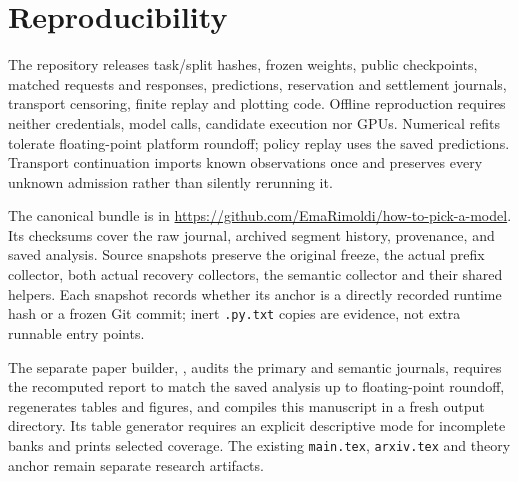 \documentclass[10pt,twocolumn]{article}
\begin{document}
\section{Reproducibility}

The repository releases task/split hashes, frozen weights, public checkpoints,
matched requests and responses, predictions, reservation and settlement journals,
transport censoring, finite replay and plotting code. Offline reproduction
requires neither credentials, model calls, candidate execution nor GPUs.
Numerical refits tolerate floating-point platform roundoff; policy replay uses
the saved predictions. Transport continuation imports known observations once
and preserves every unknown admission rather than silently rerunning it.

The canonical bundle is
in \url{https://github.com/EmaRimoldi/how-to-pick-a-model}. Its checksums cover
the raw journal, archived segment history, provenance, and saved analysis.
Source snapshots preserve the original freeze, the actual prefix collector,
both actual recovery collectors, the semantic collector and their shared
helpers. Each snapshot records whether its anchor is a directly recorded
runtime hash or a frozen Git commit; inert \texttt{.py.txt} copies are evidence,
not extra runnable entry points.

The separate paper builder, , audits the
primary and semantic journals, requires the recomputed report to match the saved
analysis up to floating-point roundoff, regenerates tables and figures, and
compiles this manuscript in a fresh output directory. Its table generator
requires an explicit descriptive mode for incomplete banks and prints selected
coverage. The existing \texttt{main.tex}, \texttt{arxiv.tex} and theory anchor
remain separate research artifacts.
\end{document}
